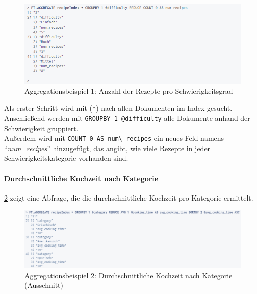 \begin{figure}[ht]  %
    \centering      %
    \includegraphics[width=1\textwidth]{pictures/redis/redisearch_aggregation_example_2.png}
    \caption{Aggregationsbeispiel 1: Anzahl der Rezepte pro Schwierigkeitsgrad}      %
    \label{pic:redisearch-aggregation-example-2}    %
\end{figure}

Als erster Schritt wird mit (\lstinline|*|) nach allen Dokumenten im Index gesucht.\\
Anschließend werden mit \lstinline|GROUPBY 1 @difficulty| alle Dokumente anhand der Schwierigkeit gruppiert.\\ 
Außerdem wird mit \lstinline|COUNT 0 AS num\_recipes| ein neues Feld namens \enquote{\emph{num\_recipes}} hinzugefügt, das angibt, wie viele Rezepte in jeder Schwierigkeitskategorie vorhanden sind.



\paragraph{Durchschnittliche Kochzeit nach Kategorie}
\cref{pic:redisearch-aggregation-example-3} zeigt eine Abfrage, die die durchschnittliche Kochzeit pro Kategorie ermittelt.

\begin{figure}[ht]  %
    \centering      %
    \includegraphics[width=1\textwidth]{pictures/redis/redisearch_aggregation_example_3.png}
    \caption{Aggregationsbeispiel 2: Durchschnittliche Kochzeit nach Kategorie (Ausschnitt)}      %
    \label{pic:redisearch-aggregation-example-3}    %
\end{figure}

